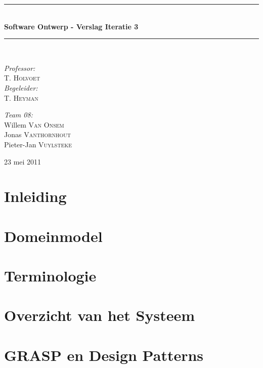 \documentclass[a4paper,titlepage]{article}
\newcommand{\HRule}{\rule{\linewidth}{0.5mm}}
\begin{document}
\begin{empfile}
\begin{titlepage}
\begin{center}
\HRule \\[0.4cm]
{ \huge \bfseries Software Ontwerp - Verslag Iteratie 3}\\[0.4cm]
\HRule \\[1.5cm]
\begin{minipage}{0.4\textwidth}
\begin{flushleft} \large
\emph{Professor:}\\
T. \textsc{Holvoet}\\
\emph{Begeleider:}\\
T. \textsc{Heyman}
\end{flushleft}
\end{minipage}
\begin{minipage}{0.4\textwidth}
\begin{flushright} \large
\emph{Team 08:} \\
Willem \textsc{Van Onsem}\\
Jonas \textsc{Vanthornhout}\\
Pieter-Jan \textsc{Vuylsteke}
\end{flushright}
\end{minipage}

\vfill

{\large 23 mei 2011}
\end{center}
\end{titlepage}
\tableofcontents

\newpage
\section*{Inleiding}

\newpage
\section{Domeinmodel}

\section{Terminologie}

\section{Overzicht van het Systeem}


\section{GRASP en Design Patterns}



\end{empfile}
\end{document}
